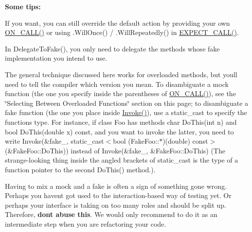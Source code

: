 {\bfseries{Some tips\+:}}


\begin{DoxyItemize}
\item If you want, you can still override the default action by providing your own {\ttfamily \mbox{\hyperlink{googletest-master_2googlemock_2include_2gmock_2gmock-spec-builders_8h_a5b12ae6cf84f0a544ca811b380c37334}{O\+N\+\_\+\+C\+A\+L\+L()}}} or using {\ttfamily .Will\+Once()} / {\ttfamily .Will\+Repeatedly()} in {\ttfamily \mbox{\hyperlink{googletest-master_2googlemock_2include_2gmock_2gmock-spec-builders_8h_a535a6156de72c1a2e25a127e38ee5232}{E\+X\+P\+E\+C\+T\+\_\+\+C\+A\+L\+L()}}}.
\item In {\ttfamily Delegate\+To\+Fake()}, you only need to delegate the methods whose fake implementation you intend to use.
\item The general technique discussed here works for overloaded methods, but you\textquotesingle{}ll need to tell the compiler which version you mean. To disambiguate a mock function (the one you specify inside the parentheses of {\ttfamily \mbox{\hyperlink{googletest-master_2googlemock_2include_2gmock_2gmock-spec-builders_8h_a5b12ae6cf84f0a544ca811b380c37334}{O\+N\+\_\+\+C\+A\+L\+L()}}}), see the \char`\"{}\+Selecting Between Overloaded Functions\char`\"{} section on this page; to disambiguate a fake function (the one you place inside {\ttfamily \mbox{\hyperlink{namespacetesting_af5cacf4475557b5a3e37af3836564235}{Invoke()}}}), use a {\ttfamily static\+\_\+cast} to specify the function\textquotesingle{}s type. For instance, if class {\ttfamily Foo} has methods {\ttfamily char Do\+This(int n)} and {\ttfamily bool Do\+This(double x) const}, and you want to invoke the latter, you need to write {\ttfamily Invoke(\&fake\+\_\+, static\+\_\+cast$<$bool (Fake\+Foo\+:\+:$\ast$)(double) const$>$(\&Fake\+Foo\+::\+Do\+This))} instead of {\ttfamily Invoke(\&fake\+\_\+, \&\+Fake\+Foo\+::\+Do\+This)} (The strange-\/looking thing inside the angled brackets of {\ttfamily static\+\_\+cast} is the type of a function pointer to the second {\ttfamily Do\+This()} method.).
\item Having to mix a mock and a fake is often a sign of something gone wrong. Perhaps you haven\textquotesingle{}t got used to the interaction-\/based way of testing yet. Or perhaps your interface is taking on too many roles and should be split up. Therefore, {\bfseries{don\textquotesingle{}t abuse this}}. We would only recommend to do it as an intermediate step when you are refactoring your code.
\end{DoxyItemize}

